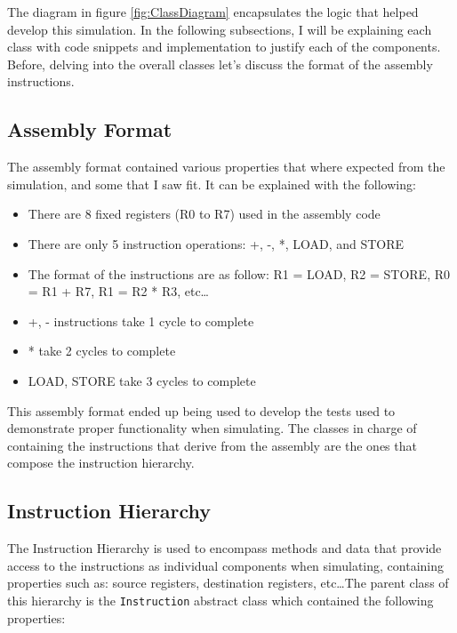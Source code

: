 \documentclass{article}
\begin{document}
The diagram in figure \ref{fig:ClassDiagram} encapsulates the logic that helped develop this simulation. In the following subsections, I will be explaining each class with code snippets and implementation to justify each of the components. Before, delving into the overall classes let's discuss the format of the assembly instructions. 

\subsection{Assembly Format}
The assembly format contained various properties that where expected from the simulation, and some that I saw fit. It can be explained with the following:

\begin{itemize}
    \item There are 8 fixed registers (R0 to R7) used in the assembly code
    \item There are only 5 instruction operations: +, -, *, LOAD, and STORE
    \item The format of the instructions are as follow: R1 = LOAD, R2 = STORE, R0 = R1 + R7, R1 = R2 * R3, etc\ldots
    \item +, - instructions take 1 cycle to complete
    \item * take 2 cycles to complete 
    \item LOAD, STORE take 3 cycles to complete
\end{itemize}

This assembly format ended up being used to develop the tests used to demonstrate proper functionality when simulating. The classes in charge of containing the instructions that derive from the assembly are the ones that compose the instruction hierarchy.

\subsection{Instruction Hierarchy}
The Instruction Hierarchy is used to encompass methods and data that provide access to the instructions as individual components when simulating, containing properties such as: source registers, destination registers, etc\ldots The parent class of this hierarchy is the \lstinline|Instruction| abstract class which contained the following properties:
\end{document}
